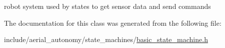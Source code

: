 robot system used by states to get sensor data and send commands 



The documentation for this class was generated from the following file\-:\begin{DoxyCompactItemize}
\item 
include/aerial\-\_\-autonomy/state\-\_\-machines/\hyperlink{basic__state__machine_8h}{basic\-\_\-state\-\_\-machine.\-h}\end{DoxyCompactItemize}
